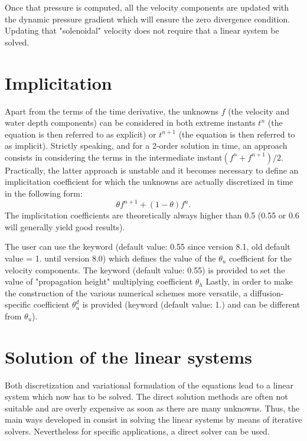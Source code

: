 Once that pressure is computed, all the velocity components are updated with
the dynamic pressure gradient which will ensure the zero divergence condition.
Updating that "solenoidal" velocity does not require that a linear system be
solved.

\section{Implicitation}

Apart from the terms of the time derivative, the unknowns $f$ (the velocity and
water depth components) can be considered in both extreme instants $t^{n}$ (the
equation is then referred to as explicit) or $t^{n+1}$ (the equation is then
referred to as implicit). Strictly speaking, and for a 2-order solution in
time, an approach consists in considering the terms in the intermediate
instant$(f^{n} +f^{n+1})/2$. Practically, the latter approach is unstable and
it becomes necessary to define an implicitation coefficient for which the
unknowns are actually discretized in time in the following form:
\[\theta f^{n+1} +(1-\theta )f^{n} .\]
The implicitation coefficients are theoretically always higher than 0.5 (0.55
or 0.6 will generally yield good results).

The user can use the keyword  (default
value: 0.55 since version 8.1, old default value = 1. until version 8.0)
which defines the value of the $\theta_{u}$ coefficient for the
velocity components. The keyword  (default
value: 0.55) is provided to set the value of "propagation height" multiplying
coefficient $\theta_{h}$ Lastly, in order to make the construction of the
various numerical schemes more versatile, a diffusion-specific coefficient
$\theta_{u}^{d}$ is provided (keyword 
(default value: 1.) and can be different from $\theta_{u}$).


\section{Solution of the linear systems}

Both discretization and variational formulation of the equations lead to a
linear system which now has to be solved. The direct solution methods are often
not suitable and are overly expensive as soon as there are many unknowns.
Thus, the main ways developed in  consist in solving the linear
systems by means of iterative solvers. Nevertheless for specific applications,
a direct solver can be used.



